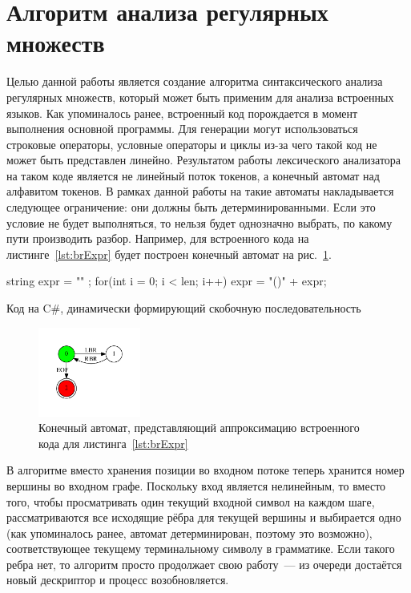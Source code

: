 \section{Алгоритм анализа регулярных множеств}
Целью данной работы является создание алгоритма синтаксического анализа регулярных множеств, который может быть применим для анализа встроенных языков. Как упоминалось ранее, встроенный код порождается в момент выполнения основной программы. Для генерации могут использоваться строковые операторы, условные операторы и циклы из-за чего такой код не может быть представлен линейно. Результатом работы лексического анализатора на таком коде является не линейный поток токенов, а конечный автомат над алфавитом токенов. В рамках данной работы на такие автоматы накладывается следующее ограничение: они должны быть детерминированными. Если это условие не будет выполняться, то нельзя будет однозначно выбрать, по какому пути производить разбор. Например, для встроенного кода на листинге~\ref{lst:brExpr} будет построен конечный автомат на рис.~\ref{input}.

\begin{listing}
\begin{pyglist}[language=csharp,numbers=left,numbersep=5pt]
 string expr = "" ;
 for(int i = 0; i < len; i++) 
 {
     expr = "()" + expr;
 }
\end{pyglist}
\caption{Код на C\#, динамически формирующий скобочную последовательность}
\label{lst:brExpr}
\end{listing}

\begin{figure}[h]
 \centering
 \includegraphics[width=0.3\textwidth]{Ragozina/pics/input.pdf}
 \caption{Конечный автомат, представляющий аппроксимацию встроенного кода для листинга~\ref{lst:brExpr} }
 \label{input}
\end{figure}

В алгоритме вместо хранения позиции во входном потоке теперь хранится номер вершины во входном графе. Поскольку вход является нелинейным, то вместо того, чтобы просматривать один текущий входной символ на каждом шаге, рассматриваются все исходящие рёбра для текущей вершины и выбирается одно (как упоминалось ранее, автомат детерминирован, поэтому это возможно), соответствующее текущему терминальному символу в грамматике. Если такого ребра нет, то алгоритм просто продолжает свою работу~--- из очереди достаётся новый дескриптор и процесс возобновляется. 

